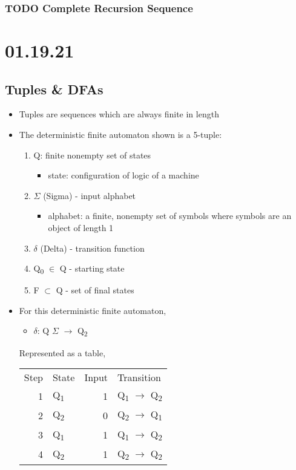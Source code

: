 \documentclass[11pt]{article}
\begin{document}
\subsubsection{{\bfseries\sffamily TODO} Complete Recursion Sequence}
\label{sec:orgd291f33}
\section{01.19.21}
\label{sec:orgc8638d8}
\subsection{Tuples \& DFAs}
\label{sec:org225cefd}
\begin{itemize}
\item Tuples are sequences which are always finite in length
\item The deterministic finite automaton shown is a 5-tuple:
\begin{enumerate}
\item Q: finite nonempty set of states
\begin{itemize}
\item state: configuration of logic of a machine
\end{itemize}
\item \(\Sigma\) (Sigma) - input alphabet
\begin{itemize}
\item alphabet: a finite, nonempty set of symbols where symbols are an object of length 1
\end{itemize}
\item \(\delta\) (Delta) - transition function
\item Q\textsubscript{0} \(\in\) Q - starting state
\item F \(\subset\) Q - set of final states
\end{enumerate}
\item For this deterministic finite automaton,
\begin{itemize}
\item \(\delta\): Q \texttimes{} \(\Sigma\) \(\to\) Q\textsubscript{2}
\end{itemize}
Represented as a table,
\begin{center}
\begin{tabular}{rlrl}
Step & State & Input & Transition\\
1 & Q\textsubscript{1} & 1 & Q\textsubscript{1} \(\to\) Q\textsubscript{2}\\
2 & Q\textsubscript{2} & 0 & Q\textsubscript{2} \(\to\) Q\textsubscript{1}\\
3 & Q\textsubscript{1} & 1 & Q\textsubscript{1} \(\to\) Q\textsubscript{2}\\
4 & Q\textsubscript{2} & 1 & Q\textsubscript{2} \(\to\) Q\textsubscript{2}\\
\end{tabular}
\end{center}
\end{itemize}
\end{document}
